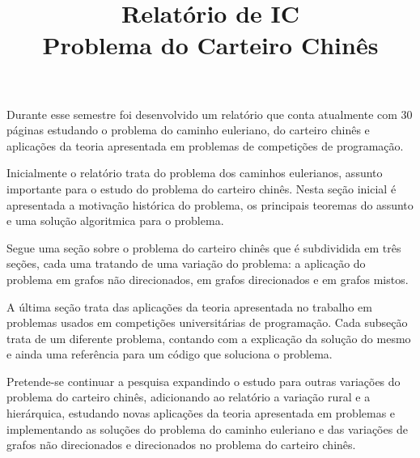 \documentclass[]{article}
\title{Relatório de IC\\Problema do Carteiro Chinês}
\date{}
\begin{document}
\maketitle

Durante esse semestre foi desenvolvido um relatório que conta atualmente com 30 páginas estudando o problema do caminho euleriano, do carteiro chinês e aplicações da teoria apresentada em problemas de competições de programação.

Inicialmente o relatório trata do problema dos caminhos eulerianos, assunto importante para o estudo do problema do carteiro chinês. Nesta seção inicial é apresentada a motivação histórica do problema, os principais teoremas do assunto e uma solução algoritmica para o problema.

Segue uma seção sobre o problema do carteiro chinês que é subdividida em três seções, cada uma tratando de uma variação do problema: a aplicação do problema em grafos não direcionados, em grafos direcionados e em grafos mistos. 

A última seção trata das aplicações da teoria apresentada no trabalho em problemas usados em competições universitárias de programação. 
Cada subseção trata de um diferente problema, contando com a explicação da solução do mesmo e ainda uma referência para um código que soluciona o problema. 

Pretende-se continuar a pesquisa expandindo o estudo para outras variações do problema do carteiro chinês, adicionando ao relatório a variação rural e a hierárquica, estudando novas aplicações da teoria apresentada em problemas e implementando as soluções do problema do caminho euleriano e das variações de grafos não direcionados e direcionados no problema do carteiro chinês.
\end{document}
